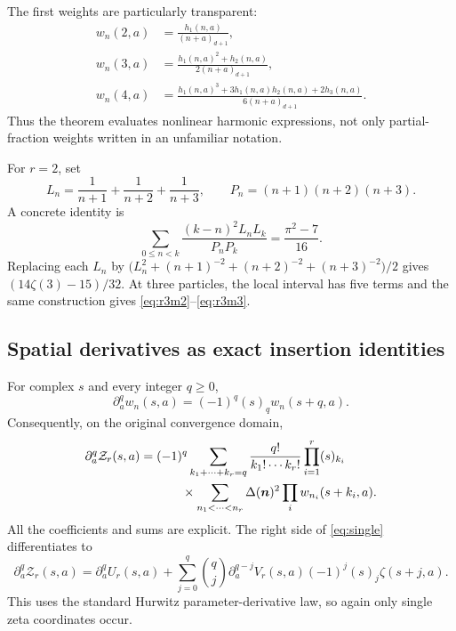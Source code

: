 \documentclass[11pt,letterpaper]{article}
\numberwithin{equation}{section}
\theoremstyle{definition}\newtheorem{definition}[theorem]{Definition}
\theoremstyle{remark}\newtheorem{remark}[theorem]{Remark}
\newcommand{\Z}{\mathcal Z}\newcommand{\Bell}{\mathcal B}
\begin{document}
The first weights are particularly transparent:
\begin{align*}
 w_n(2,a)&=\frac{h_1(n,a)}{(n+a)_{d+1}},\\
 w_n(3,a)&=\frac{h_1(n,a)^2+h_2(n,a)}{2(n+a)_{d+1}},\\
 w_n(4,a)&=\frac{h_1(n,a)^3+3h_1(n,a)h_2(n,a)+2h_3(n,a)}
                  {6(n+a)_{d+1}}.
\end{align*}
Thus the theorem evaluates nonlinear harmonic expressions, not only
partial-fraction weights written in an unfamiliar notation.

For $r=2$, set
\[
 L_n=\frac1{n+1}+\frac1{n+2}+\frac1{n+3},\qquad
 P_n=(n+1)(n+2)(n+3).
\]
A concrete identity is
\begin{equation}\label{eq:concrete-harmonic}
 \boxed{\displaystyle
 \sum_{0\le n<k}\frac{(k-n)^2L_nL_k}{P_nP_k}
       =\frac{\pi^2-7}{16}.}
\end{equation}
Replacing each $L_n$ by
$\bigl(L_n^2+(n+1)^{-2}+(n+2)^{-2}+(n+3)^{-2}\bigr)/2$
gives $(14\zeta(3)-15)/32$. At three particles, the local interval
has five terms and the same construction gives
\eqref{eq:r3m2}--\eqref{eq:r3m3}.

\subsection{Spatial derivatives as exact insertion identities}
For complex $s$ and every integer $q\ge0$,
\begin{equation}\label{eq:shift-weight}
 \partial_a^q w_n(s,a)=(-1)^q(s)_q w_n(s+q,a).
\end{equation}
Consequently, on the original convergence domain,
\begin{align}
 \partial_a^q\Z_r(s,a)
 ={}&(-1)^q\sum_{k_1+\cdots+k_r=q}
    \frac{q!}{k_1!\cdots k_r!}\prod_{i=1}^r(s)_{k_i}\notag\\
 &\qquad\times\sum_{n_1<\cdots<n_r}\Delta(\bm n)^2
       \prod_i w_{n_i}(s+k_i,a).
 \label{eq:insertion-ladder}
\end{align}
All the coefficients and sums are explicit. The right side of
\eqref{eq:single} differentiates to
\begin{equation}\label{eq:spatial-zeta}
 \partial_a^q\Z_r(s,a)=\partial_a^q U_r(s,a)
 +\sum_{j=0}^q\binom qj\partial_a^{q-j}V_r(s,a)
          (-1)^j(s)_j\zeta(s+j,a).
\end{equation}
This uses the standard Hurwitz parameter-derivative law, so again only
single zeta coordinates occur.
\end{document}
